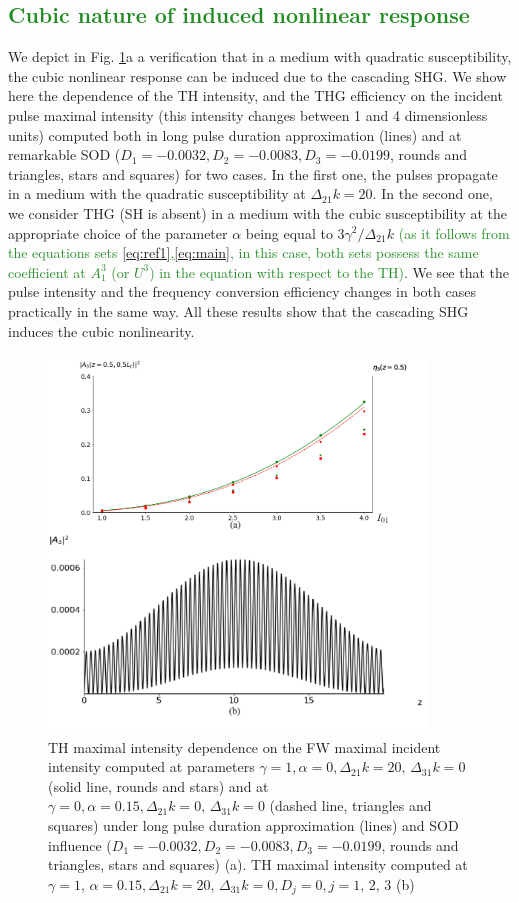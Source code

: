 \documentclass[a4paper, 12pt, onecolumn]{extarticle}
\begin{document}
\textcolor{ForestGreen}
{
\subsection{Cubic nature of induced nonlinear response}
}
We depict in Fig. \ref{fr:f}a a verification that in a medium with quadratic susceptibility, the cubic nonlinear response can be induced due to the cascading SHG. We show here the dependence of the TH intensity, and the THG efficiency on the incident pulse maximal intensity (this intensity changes between 1 and 4 dimensionless units) computed both in long pulse duration approximation (lines) and at remarkable SOD (\(D_1=-0.0032, D_2 =  -0.0083, D_3 =  -0.0199\), rounds and triangles, stars and squares) for two cases. In the first one, the pulses propagate in a medium with the quadratic susceptibility at \(\Delta_{21}k=20\). In the second one, we consider THG (SH is absent) in a medium with the cubic susceptibility at the appropriate choice of the parameter \(\alpha\) being equal to \(3\gamma^2/\Delta_{21}k\) \textcolor{ForestGreen}{(as it follows from the equations sets \eqref{eq:ref1},\eqref{eq:main}, in this case, both sets possess the same coefficient at $A_1^3$ (or $U^3$) in the equation with respect to the TH)}. We see that the pulse intensity and the frequency conversion efficiency changes in both cases practically in the same way. All these results show that the cascading SHG induces the cubic nonlinearity.
\begin{figure}[h!] 
\centering 
\includegraphics[height=10cm, width=0.7\linewidth]{CascadeF}  
\caption{TH maximal intensity dependence on the FW maximal incident intensity computed at parameters \(\gamma=1,\alpha=0,\Delta_{21}k=20,\,\Delta_{31}k=0\) (solid line, rounds and stars) and at \(\gamma=0,\alpha=0.15,\Delta_{21}k=0,\,\Delta_{31}k=0\) (dashed line, triangles and squares) under long pulse duration approximation (lines) and SOD influence (\(D_1=-0.0032, D_2 =  -0.0083, D_3 =  -0.0199\), rounds and triangles, stars and squares) (a). TH maximal intensity computed at $\gamma=1,\,\alpha=0.15,\Delta_{21}k=20,\,\Delta_{31}k=0,D_j=0,j=1,\,2,\,3$ (b)}
\label{fr:f}
\end{figure}
\end{document}
